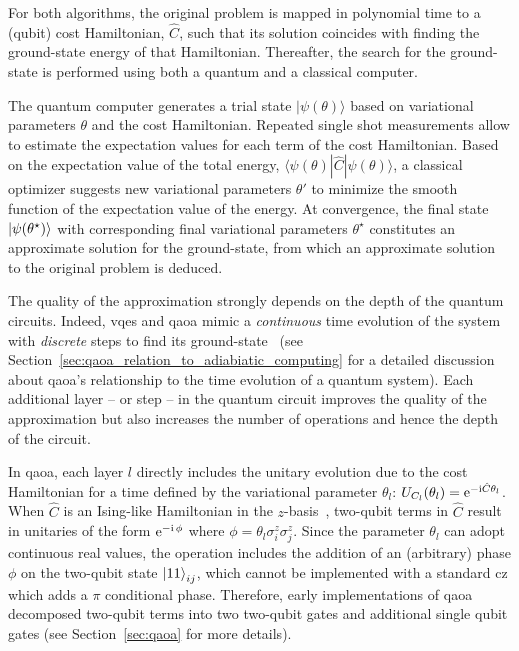 For both algorithms, the original problem is mapped in polynomial time to a (qubit) cost Hamiltonian, $\hat C$, such that its solution coincides with finding the ground-state energy of that Hamiltonian. Thereafter, the search for the ground-state is performed using both a quantum and a classical computer. 

The quantum computer generates a trial state $|\psi(\theta)\rangle$ based on variational parameters $\theta$ and the cost Hamiltonian. Repeated single shot measurements allow to estimate the expectation values for each term of the cost Hamiltonian. Based on the expectation value of the total energy, $\langle \psi(\theta) | \hat C |  \psi(\theta) \rangle$,  a classical optimizer suggests new variational parameters $\theta'$ to minimize the smooth function of the expectation value of the energy. At convergence, the final state $\ket{\psi(\theta^\star)}$ with corresponding final variational parameters $\theta^\star$ constitutes an approximate solution for the ground-state, from which an approximate solution to the original problem is deduced. 

The quality of the approximation strongly depends on the depth of the  quantum circuits. Indeed, \glspl{vqe} and \gls{qaoa} mimic a \textit{continuous} time evolution of the system with \textit{discrete} steps to find its ground-state~\cite{Lloyd1996UniversalSimulators} (see Section~\ref{sec:qaoa_relation_to_adiabiatic_computing} for a detailed discussion about \gls{qaoa}'s relationship to the time evolution of a quantum system). Each additional layer -- or step -- in the quantum circuit improves the quality of the approximation but also increases the number of operations and hence the depth of the circuit. 

In \gls{qaoa}, each layer $l$ directly includes the unitary evolution due to the cost Hamiltonian for a time defined by the variational parameter $\theta_l$: $U_{C_l}(\theta_l) = \mathrm e^{-\mathrm i\hat C \theta_l}$. When $\hat C$ is an Ising-like Hamiltonian in the $z$-basis~\cite{Lucas2014IsingProblems},  two-qubit terms in $\hat C$ result in unitaries of the form $\mathrm e^{-\mathrm i\,\phi}$ where $\phi = \theta_l\sigma_i^z\sigma_j^z$. Since the parameter $\theta_l$ can adopt continuous real values, the operation includes the addition of an (arbitrary) phase $\phi$ on the two-qubit state $\ket{11}_{ij}$, which cannot be implemented with a standard \gls{cz} which adds a $\pi$ conditional phase. Therefore, early implementations of \gls{qaoa} decomposed two-qubit terms into two two-qubit gates and additional single qubit gates (see Section~\ref{sec:qaoa} for more details). 

